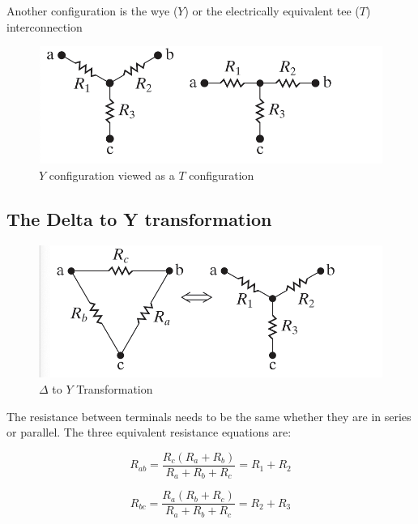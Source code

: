 \documentclass[14pt]{memoir}
\begin{document}
Another configuration is the wye ($Y$) or the electrically equivalent tee ($T$) interconnection

\begin{figure}[H]
\begin{center}
\includegraphics[scale=0.50]{fig/fig03_33.png}
\caption{$Y$ configuration viewed as a $T$ configuration}
\label{fig:fig03_33}
\end{center}
\end{figure}

\subsection{The Delta to Y transformation}

\begin{figure}[H]
\begin{center}
\includegraphics[scale=0.50]{fig/fig03_34.png}
\caption{$\Delta$ to $Y$ Transformation}
\label{fig:fig03_34}
\end{center}
\end{figure}

The resistance between terminals needs to be the same whether they are in series or parallel. The three equivalent resistance equations are:

\begin{equation}
R_{ab} = \frac{R_c (R_a + R_b)}{R_a +R_b + R_c} = R_1 + R_2
\end{equation}

\begin{equation}
R_{bc} = \frac{R_a (R_b + R_c)}{R_a +R_b + R_c} = R_2 + R_3
\end{equation}
\end{document}
